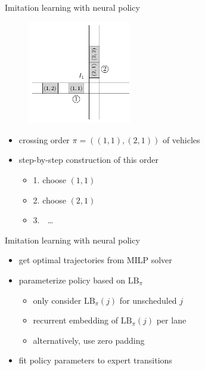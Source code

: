 \documentclass[bigger]{beamer}
\begin{document}
\begin{frame}[label={sec:org4f1b4cd}]{Imitation learning with neural policy}
\begin{figure}
  \centering
  \includegraphics[width=0.4\textwidth]{figures/network_ordering-single.pdf}
\end{figure}

\begin{itemize}
\item crossing order \(\pi = ((1,1), (2,1))\) of vehicles
\item step-by-step construction of this order
\begin{itemize}
\item 1. choose \((1,1)\)
\item 2. choose \((2,1)\)
\item 3. \(\;\) \ldots{}
\end{itemize}
\end{itemize}
\end{frame}
\begin{frame}[label={sec:org7e4c43f}]{Imitation learning with neural policy}
\begin{itemize}
\item get optimal trajectories from MILP solver
\item parameterize policy based on \(\text{LB}_\pi\)
\begin{itemize}
\item only consider \(\text{LB}_\pi(j)\) for unscheduled \(j\)
\item recurrent embedding of \(\text{LB}_\pi(j)\) per lane
\item alternatively, use zero padding
\end{itemize}
\item fit policy parameters to expert transitions
\end{itemize}
\end{frame}
\end{document}
